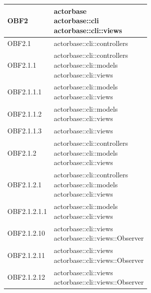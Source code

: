 \documentclass{scalatekids-article}
\begin{document}
\begin{longtable}[H]{|p{6cm}|p{11cm}|}
\hline
OBF2 & \multiLineCell[t]{actorbase\\actorbase::cli\\actorbase::cli::views\\}\\
\hline
OBF2.1 & \multiLineCell[t]{actorbase::cli::controllers\\}\\
\hline
OBF2.1.1 & \multiLineCell[t]{actorbase::cli::controllers\\actorbase::cli::models\\actorbase::cli::views\\}\\
\hline
OBF2.1.1.1 & \multiLineCell[t]{actorbase::cli::models\\actorbase::cli::views\\}\\
\hline
OBF2.1.1.2 & \multiLineCell[t]{actorbase::cli::models\\actorbase::cli::views\\}\\
\hline
OBF2.1.1.3 & \multiLineCell[t]{actorbase::cli::views\\}\\
\hline
OBF2.1.2 & \multiLineCell[t]{actorbase::cli::controllers\\actorbase::cli::models\\actorbase::cli::views\\}\\
\hline
OBF2.1.2.1 & \multiLineCell[t]{actorbase::cli::controllers\\actorbase::cli::models\\actorbase::cli::views\\}\\
\hline
OBF2.1.2.1.1 & \multiLineCell[t]{actorbase::cli::models\\actorbase::cli::views\\}\\
\hline
OBF2.1.2.10 & \multiLineCell[t]{actorbase::cli::views\\actorbase::cli::views::Observer\\}\\
\hline
OBF2.1.2.11 & \multiLineCell[t]{actorbase::cli::views\\actorbase::cli::views::Observer\\}\\
\hline
OBF2.1.2.12 & \multiLineCell[t]{actorbase::cli::views\\actorbase::cli::views::Observer\\}\\

\end{longtable}
\end{document}
